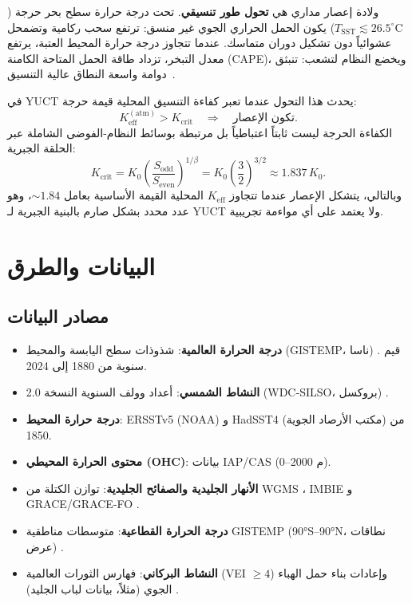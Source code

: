 \documentclass[11pt,a4paper]{article}
\newcommand{\Keff}{K_{\mathrm{eff}}}
\begin{document}
	ولادة إعصار مداري هي \textbf{تحول طور تنسيقي}. تحت درجة حرارة سطح بحر حرجة (\(T_{\mathrm{SST}} \lesssim 26.5^{\circ}\mathrm{C}\)) يكون الحمل الحراري الجوي غير منسق: ترتفع سحب ركامية وتضمحل عشوائياً دون تشكيل دوران متماسك. عندما تتجاوز درجة حرارة المحيط العتبة، يرتفع معدل التبخر، تزداد طاقة الحمل المتاحة الكامنة (CAPE)، ويخضع النظام لتشعب: تنبثق دوامة واسعة النطاق عالية التنسيق~\cite{Emanuel2003}.
	
	في YUCT يحدث هذا التحول عندما تعبر كفاءة التنسيق المحلية قيمة حرجة:
	\begin{equation}
		\Keff^{\mathrm{(atm)}} > K_{\mathrm{crit}} \quad \Longrightarrow \quad
		\text{تكون الإعصار}.
	\end{equation}
	الكفاءة الحرجة ليست ثابتاً اعتباطياً بل مرتبطة بوسائط النظام-الفوضى الشاملة عبر الحلقة الجبرية:
	\begin{equation}
		K_{\mathrm{crit}} = K_0 \left( \frac{S_{\mathrm{odd}}}{S_{\mathrm{even}}} \right)^{1/\beta}
		= K_0 \left( \frac{3}{2} \right)^{3/2} \approx 1.837\,K_0 .
	\end{equation}
	وبالتالي، يتشكل الإعصار عندما تتجاوز \(K_{\mathrm{eff}}\) المحلية القيمة الأساسية بعامل \(\sim 1.84\)، وهو عدد محدد بشكل صارم بالبنية الجبرية لـ YUCT ولا يعتمد على أي مواءمة تجريبية.
	
	\section{البيانات والطرق}
	
	\subsection{مصادر البيانات}
	
	\begin{itemize}
		\item \textbf{درجة الحرارة العالمية}: شذوذات سطح اليابسة والمحيط (GISTEMP، ناسا) \cite{GISTEMP}. قيم سنوية من 1880 إلى 2024.
		\item \textbf{النشاط الشمسي}: أعداد وولف السنوية النسخة 2.0 (WDC‑SILSO، بروكسل) \cite{SILSO}.
		\item \textbf{درجة حرارة المحيط}: ERSSTv5 (NOAA) و HadSST4 (مكتب الأرصاد الجوية) \cite{ERSST, HADSST} من 1850.
		\item \textbf{محتوى الحرارة المحيطي (OHC)}: بيانات IAP/CAS \cite{IAPOHC} (0–2000 م).
		\item \textbf{الأنهار الجليدية والصفائح الجليدية}: توازن الكتلة من WGMS \cite{WGMS}، IMBIE \cite{IMBIE} و GRACE/GRACE-FO \cite{GRACE}.
		\item \textbf{درجة الحرارة القطاعية}: متوسطات مناطقية GISTEMP (90°S–90°N، نطاقات عرض) \cite{GISTEMPZonal}.
		\item \textbf{النشاط البركاني}: فهارس الثورات العالمية (VEI \(\ge 4\)) وإعادات بناء حمل الهباء الجوي (مثلاً، بيانات لباب الجليد) \cite{VolcanoCatalog}.
	\end{itemize}
	
\end{document}
